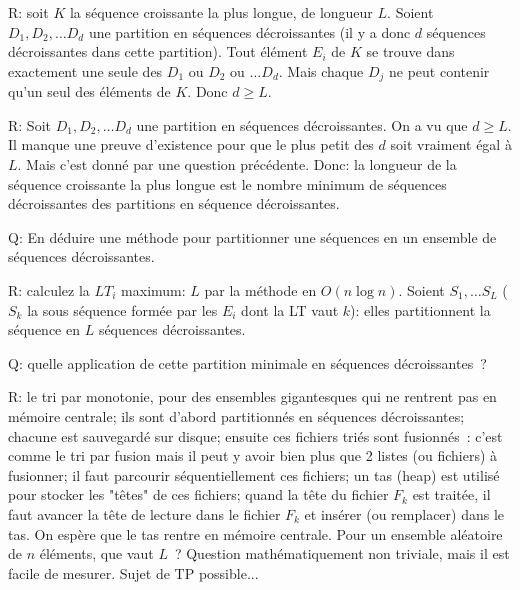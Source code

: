 \documentclass[a4paper]{article}
\begin{document}
R: 
soit $K$ la  s\'equence croissante la plus longue, de longueur $L$.
Soient $D_1, D_2, \ldots D_d$ une partition en  s\'equences d\'ecroissantes (il y a donc $d$  s\'equences d\'ecroissantes dans cette partition).
Tout \'el\'ement $E_i$ de $K$ se trouve dans exactement une seule des $D_1$ ou $D_2$ ou $\ldots D_d$.  Mais chaque $D_j$ ne peut contenir
qu'un seul des \'el\'ements de $K$. Donc $d\ge L$.


R: Soit $D_1, D_2, \ldots D_d$ une partition en  s\'equences d\'ecroissantes. On a vu que $d\ge L$. Il manque une preuve d'existence pour que le plus petit des $d$ 
soit vraiment \'egal \`a  $L$. Mais c'est donn\'e par une question pr\'ec\'edente. Donc: la longueur de la s\'equence croissante la plus longue est 
le nombre minimum de  s\'equences d\'ecroissantes des partitions en s\'equence d\'ecroissantes.

Q: En d\'eduire une m\'ethode pour partitionner une s\'equences en un ensemble de s\'equences d\'ecroissantes.

R: calculez la $LT_i$ maximum: $L$ par la m\'ethode en $O(n \log n)$. Soient $S_1, \ldots S_L$ ($S_k$ la sous s\'equence form\'ee par les $E_i$ dont la LT  vaut $k$): 
elles partitionnent la s\'equence en  $L$ s\'equences d\'ecroissantes.

Q: quelle application de cette partition minimale en s\'equences d\'ecroissantes~?

R: le tri par monotonie, pour des ensembles gigantesques qui ne rentrent pas en m\'emoire centrale; ils sont d'abord partitionn\'es en s\'equences
d\'ecroissantes; chacune est sauvegard\'e sur disque; ensuite ces fichiers tri\'es sont fusionn\'es~: c'est comme le tri par fusion mais 
il peut y avoir bien plus que 2 listes (ou fichiers) \`a fusionner; il faut parcourir s\'equentiellement ces fichiers; un tas (heap) est  utilis\'e
pour stocker les "t\^etes" de ces fichiers; quand la t\^ete du fichier $F_k$ est trait\'ee, il faut avancer la t\^ete de lecture dans le fichier $F_k$
et ins\'erer (ou remplacer) dans le tas. On esp\`ere que le tas rentre en m\'emoire centrale. Pour un ensemble al\'eatoire de $n$ \'el\'ements,
que vaut $L$~? Question math\'ematiquement non triviale, mais il est facile de mesurer. Sujet de TP possible...
\end{document}
